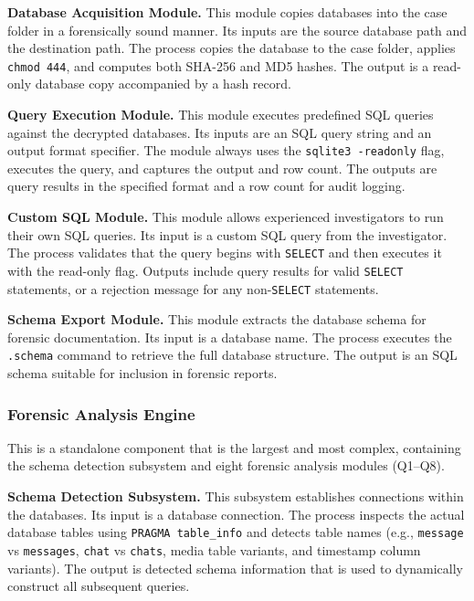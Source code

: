 \documentclass[12pt,a4paper]{report}
\begin{document}
\textbf{Database Acquisition Module.} This module copies databases into the case folder in a forensically sound manner. Its inputs are the source database path and the destination path. The process copies the database to the case folder, applies \texttt{chmod 444}, and computes both SHA-256 and MD5 hashes. The output is a read-only database copy accompanied by a hash record.

\textbf{Query Execution Module.} This module executes predefined SQL queries against the decrypted databases. Its inputs are an SQL query string and an output format specifier. The module always uses the \texttt{sqlite3 -readonly} flag, executes the query, and captures the output and row count. The outputs are query results in the specified format and a row count for audit logging.

\textbf{Custom SQL Module.} This module allows experienced investigators to run their own SQL queries. Its input is a custom SQL query from the investigator. The process validates that the query begins with \texttt{SELECT} and then executes it with the read-only flag. Outputs include query results for valid \texttt{SELECT} statements, or a rejection message for any non-\texttt{SELECT} statements.

\textbf{Schema Export Module.} This module extracts the database schema for forensic documentation. Its input is a database name. The process executes the \texttt{.schema} command to retrieve the full database structure. The output is an SQL schema suitable for inclusion in forensic reports.

\subsubsection{Forensic Analysis Engine}

This is a standalone component that is the largest and most complex, containing the schema detection subsystem and eight forensic analysis modules (Q1--Q8).

\textbf{Schema Detection Subsystem.} This subsystem establishes connections within the databases. Its input is a database connection. The process inspects the actual database tables using \texttt{PRAGMA table\_info} and detects table names (e.g., \texttt{message} vs \texttt{messages}, \texttt{chat} vs \texttt{chats}, media table variants, and timestamp column variants). The output is detected schema information that is used to dynamically construct all subsequent queries.
\end{document}
